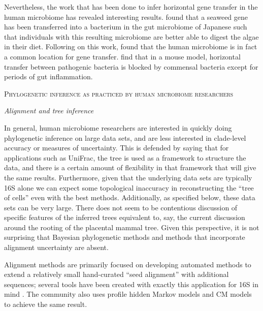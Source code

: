 \documentclass{amsart}
\renewcommand{\section}[1]{%
\bigskip
\begin{center}
\begin{Large}
\normalfont\scshape #1
\medskip
\end{Large}
\end{center}}
\renewcommand{\subsection}[1]{%
\bigskip
\begin{center}
\begin{large}
\normalfont\itshape #1
\end{large}
\end{center}}
\begin{document}
Nevertheless, the work that has been done to infer horizontal gene transfer in the human microbiome has revealed interesting results.
\citet{hehemann2010transfer} found that a seaweed gene has been transferred into a bacterium in the gut microbiome of Japanese such that individuals with this resulting microbiome are better able to digest the algae in their diet.
Following on this work, \citet{smillie2011ecology} found that the human microbiome is in fact a common location for gene transfer.
\citet{stecher2012gut} find that in a mouse model, horizontal transfer between pathogenic bacteria is blocked by commensal bacteria except for periods of gut inflammation.


\section{Phylogenetic inference as practiced by human microbiome researchers}

\subsection{Alignment and tree inference}
In general, human microbiome researchers are interested in quickly doing phylogenetic inference on large data sets, and are less interested in clade-level accuracy or measures of uncertainty.
This is defended by saying that for applications such as UniFrac, the tree is used as a framework to structure the data, and there is a certain amount of flexibility in that framework that will give the same results.
Furthermore, given that the underlying data sets are typically 16S alone we can expect some topological inaccuracy in reconstructing the ``tree of cells'' even with the best methods.
Additionally, as specified below, these data sets can be very large.
There does not seem to be contentious discussion of specific features of the inferred trees equivalent to, say, the current discussion around the rooting of the placental mammal tree.
Given this perspective, it is not surprising that Bayesian phylogenetic methods and methods that incorporate alignment uncertainty are absent.

Alignment methods are primarily focused on developing automated methods to extend a relatively small hand-curated ``seed alignment'' with additional sequences; several tools have been created with exactly this application for 16S in mind \citep{desantis2006nast,caporaso2010pynast,pruesse2012sina}.
The community also uses profile hidden Markov models \citep{eddy1998profile} and CM models \citep{nawrocki2009infernal,nawrocki2009structural} to achieve the same result.
\end{document}
